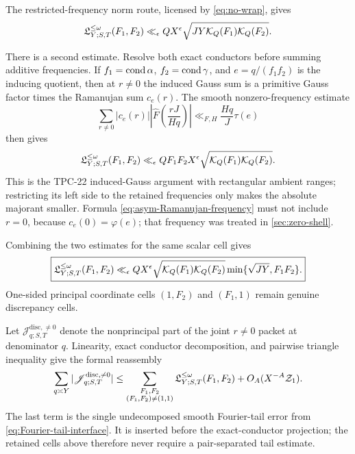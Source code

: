 The restricted-frequency norm route, licensed by
\eqref{eq:no-wrap}, gives
\begin{equation}
 \mathfrak L_{Y;S,T}^{\le\omega}(F_1,F_2)
 \ll_\epsilon QX^\epsilon
 \sqrt{JY\mathcal K_Q(F_1)\mathcal K_Q(F_2)}.
 \label{eq:asymmetric-norm-route}
\end{equation}

There is a second estimate.  Resolve both exact conductors before
summing additive frequencies.  If
\(f_1=\operatorname{cond}\alpha\), \(f_2=\operatorname{cond}\gamma\), and
\(e=q/(f_1f_2)\) is the inducing quotient, then at \(r\ne0\) the
induced Gauss sum is a primitive Gauss factor times the Ramanujan sum
\(c_e(r)\).  The smooth nonzero-frequency estimate
\begin{equation}
 \sum_{r\ne0}|c_e(r)|
 \left|\widehat F\left(\frac{rJ}{Hq}\right)\right|
 \ll_{F,H}\frac{Hq}{J}\tau(e)
 \label{eq:asym-Ramanujan-frequency}
\end{equation}
then gives
\begin{equation}
 \mathfrak L_{Y;S,T}^{\le\omega}(F_1,F_2)
 \ll_\epsilon QF_1F_2X^\epsilon
 \sqrt{\mathcal K_Q(F_1)\mathcal K_Q(F_2)}.
 \label{eq:asymmetric-Gauss-route}
\end{equation}
This is the TPC-22 induced-Gauss argument with rectangular ambient
ranges; restricting its left side to the retained frequencies only
makes the absolute majorant smaller.  Formula
\eqref{eq:asym-Ramanujan-frequency} must not include
\(r=0\), because \(c_e(0)=\varphi(e)\); that frequency was treated in
\cref{sec:zero-shell}.

Combining the two estimates for the same scalar cell gives
\begin{equation}
 \boxed{
 \mathfrak L_{Y;S,T}^{\le\omega}(F_1,F_2)
 \ll_\epsilon QX^\epsilon
 \sqrt{\mathcal K_Q(F_1)\mathcal K_Q(F_2)}
 \min\{\sqrt{JY},F_1F_2\}.}
 \label{eq:asymmetric-cell-bound}
\end{equation}
One-sided principal coordinate cells \((1,F_2)\) and \((F_1,1)\)
remain genuine discrepancy cells.

Let \(\mathscr J_{q;S,T}^{\mathrm{disc},\ne0}\) denote the
nonprincipal part of the joint \(r\ne0\) packet at denominator \(q\).
Linearity, exact conductor decomposition, and pairwise triangle
inequality give the formal reassembly
\begin{equation}
 \sum_{q\asymp Y}
 |\mathscr J_{q;S,T}^{\mathrm{disc},\ne0}|
 \le
 \sum_{\substack{F_1,F_2\\(F_1,F_2)\ne(1,1)}}
 \mathfrak L_{Y;S,T}^{\le\omega}(F_1,F_2)
 +O_A(X^{-A}\mathcal Z_1).
 \label{eq:asymmetric-cell-reassembly}
\end{equation}
The last term is the single undecomposed smooth Fourier-tail error
from \eqref{eq:Fourier-tail-interface}.  It is inserted before the
exact-conductor projection; the retained cells above therefore never
require a pair-separated tail estimate.


